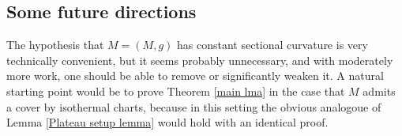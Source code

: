 \documentclass[reqno,10pt]{amsart}
\newcommand{\Hyp}{\mathbf H}
\newcommand*\dif{\mathop{}\!\mathrm{d}}
\newtheorem{proposition}[theorem]{Proposition}
\theoremstyle{definition}
\numberwithin{equation}{section}
\begin{document}


\subsection{Some future directions}\label{open problems}
The hypothesis that $M = (M, g)$ has constant sectional curvature is very technically convenient, but it seems probably unnecessary, and with moderately more work, one should be able to remove or significantly weaken it.
A natural starting point would be to prove Theorem \ref{main lma} in the case that $M$ admits a cover by isothermal charts, because in this setting the obvious analogoue of Lemma \ref{Plateau setup lemma} would hold with an identical proof.
\end{document}
